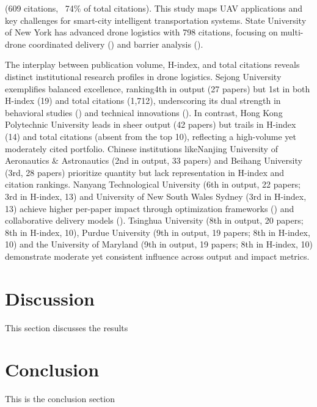 \documentclass{article}
\begin{document}
(609 citations, ~74\% of total citations). This study ​​maps UAV applications and ​​key challenges for smart-city intelligent transportation systems. State University of New York​​ has advanced drone logistics with ​​798 citations, focusing on ​​multi-drone coordinated delivery​​ (\cite{WOS:000509790500020}) and ​​barrier analysis (\cite{WOS:000547773000001})​​.

The interplay between publication volume, H-index, and total citations reveals distinct institutional research profiles in drone logistics. ​​Sejong University​​ exemplifies balanced excellence, ranking ​​4th in output​​ (27 papers) but ​​1st in both H-index (19) and total citations (1,712)​​, underscoring its dual strength in behavioral studies (\cite{WOS:000478712400012}) and technical innovations (\cite{WOS:000538038400010}). In contrast, ​​Hong Kong Polytechnic University​​ leads in sheer output (42 papers) but trails in H-index (14) and total citations (absent from the top 10), reflecting a high-volume yet moderately cited portfolio. Chinese institutions like ​​Nanjing University of Aeronautics & Astronautics​​ (2nd in output, 33 papers) and ​​Beihang University​​ (3rd, 28 papers) prioritize quantity but lack representation in H-index and citation rankings. Nanyang Technological University​​ (6th in output, 22 papers; 3rd in H-index, 13) and ​​University of New South Wales Sydney​​ (3rd in H-index, 13) achieve higher per-paper impact through optimization frameworks​​ (\cite{WOS:000501349900060}) and ​​collaborative delivery models​​ (\cite{WOS:000467564700204}). Tsinghua University (8th in output, 20 papers; 8th in H-index, 10), Purdue University (9th in output, 19 papers; 8th in H-index, 10) and the University of Maryland (9th in output, 19 papers; 8th in H-index, 10) demonstrate moderate yet consistent influence across output and impact metrics.



\section{Discussion}
This section discusses the results

\section{Conclusion}
This is the conclusion section

\printbibliography
\end{document}
